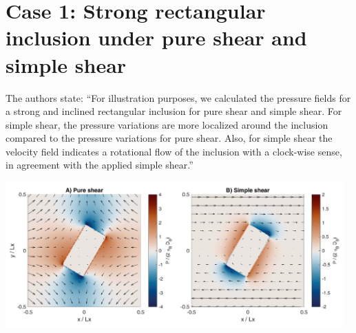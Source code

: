 \newpage
\section*{Case 1: Strong rectangular inclusion under pure shear and simple shear}

The authors state:
``For illustration purposes, we calculated the pressure fields for a strong and inclined rectangular 
inclusion for pure shear and simple shear. For simple shear, the
pressure variations are more localized around the inclusion compared to
the pressure variations for pure shear. Also, for simple shear the velocity
field indicates a rotational flow of the inclusion with a clock-wise sense,
in agreement with the applied simple shear.''

\begin{center}
\includegraphics[width=13cm]{python_codes/fieldstone_142/images/hams22_c}\\
\end{center}

